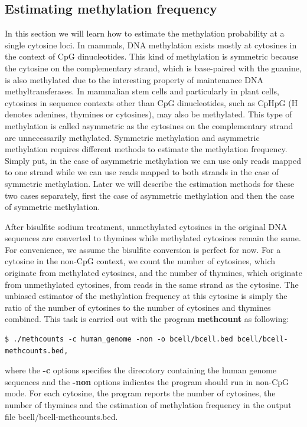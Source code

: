 \documentclass{article}
\begin{document}
\subsection{Estimating methylation frequency}
\label{sec:estim-methyl-freq}
In this section we will learn how to estimate the methylation
probability at a single cytosine loci. In mammals, DNA methylation
exists mostly at cytosines in the context of CpG dinucleotides. This
kind of methylation is symmetric because the cytosine on the
complementary strand, which is base-paired with the guanine, is also
methylated due to the interesting property of maintenance DNA
methyltransferases. In mammalian stem cells and particularly in plant
cells, cytosines in sequence contexts other than CpG dinucleotides,
such as CpHpG (H denotes adenines, thymines or cytosines), may also be
methylated. This type of methylation is called asymmetric as the
cytosines on the complementary strand are unnecessarily
methylated. Symmetric methylation and asymmetric methylation requires
different methods to estimate the methylation frequency. Simply put,
in the case of asymmetric methylation we can use only reads mapped to
one strand while we can use reads mapped to both strands in the case
of symmetric methylation. Later we will describe the estimation
methods for these two cases separately, first the case of asymmetric
methylation and then the case of symmetric methylation. 
 
After bisulfite sodium treatment, unmethylated cytosines in the
original DNA sequences are converted to thymines while methylated
cytosines remain the same. For convenience, we assume the bisulfite
conversion is perfect for now. For a cytosine in the non-CpG context,
we count the number of cytosines, which originate from methylated
cytosines, and the number of thymines, which originate from
unmethylated cytosines, from reads in the same strand as the
cytosine. The unbiased estimator of the methylation frequency at this
cytosine is simply the ratio of the number of cytosines to the number
of cytosines and thymines combined. This task is carried out with the
program \textbf{methcount} as following:
\begin{verbatim}
$ ./methcounts -c human_genome -non -o bcell/bcell.bed bcell/bcell-methcounts.bed,  
\end{verbatim}
where the \textbf{-c} options specifies the direcotory containing the
human genome sequences and the \textbf{-non} options indicates the
program should run in non-CpG mode. For each cytosine, the program
reports the number of cytosines, the number of thymines and the
estimation of methylation frequency in the output file
bcell/bcell-methcounts.bed. 
\end{document}
